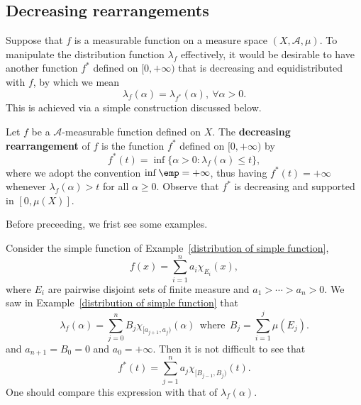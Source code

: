 \subsection{Decreasing rearrangements}
Suppose that $f$ is a measurable function on a measure space $(X,\mathcal{A},\mu)$. To manipulate the distribution function $\lambda_f$ effectively, it would be desirable to have another function $f^*$ defined on $[0,+\infty)$ that is decreasing and equidistributed with $f$, by which we mean
\[\lambda_f(\alpha)=\lambda_{f^*}(\alpha),\ \forall\alpha>0.\]
This is achieved via a simple construction discussed below.
\begin{definition}
Let $f$ be a $\mathcal{A}$-measurable function defined on $X$. The \textbf{decreasing rearrangement} of $f$ is the function $f^*$ defined on $[0,+\infty)$ by
\[f^*(t)=\inf\{\alpha>0:\lambda_f(\alpha)\leq t\},\]
where we adopt the convention $\inf\emp=+\infty$, thus having $f^*(t)=+\infty$ whenever $\lambda_f(\alpha)>t$ for all $\alpha\geq 0$. Observe that $f^*$ is decreasing and supported in $[0,\mu(X)]$.
\end{definition}
Before preceeding, we frist see some examples.
\begin{example}\label{decreasing rearrangement of simple}
Consider the simple function of Example~\ref{distribution of simple function},
\[f(x)=\sum_{i=1}^{n}a_i\chi_{E_i}(x),\]
where $E_i$ are pairwise disjoint sets of finite measure and $a_1>\cdots>a_n>0$. We saw in Example~\ref{distribution of simple function} that
\[\lambda_f(\alpha)=\sum_{j=0}^{n}B_j\chi_{[a_{j+1},a_j)}(\alpha)\ \ \text{where}\ \ B_j=\sum_{i=1}^{j}\mu(E_j).\]
and $a_{n+1}=B_0=0$ and $a_0=+\infty$. Then it is not difficult to see that
\[f^*(t)=\sum_{j=1}^{n}a_j\chi_{[B_{j-1},B_j)}(t).\]
One should compare this expression with that of $\lambda_f(\alpha)$.
\end{example}

